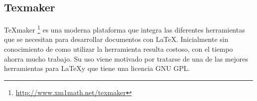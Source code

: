 \subsection{Texmaker}

\TeX maker \footnote{\url{http://www.xm1math.net/texmaker}} es una moderna plataforma que integra las diferentes herramientas que se necesitan para desarrollar documentos con \LaTeX. Inicialmente sin conocimiento de como utilizar la herramienta resulta costoso, con el tiempo ahorra mucho trabajo. Su uso viene motivado por tratarse de una de las mejores herramientas para \LaTeX y que tiene una licencia GNU GPL.
